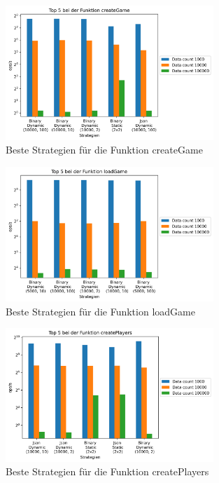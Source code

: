 \begin{figure}[htp]
    \centering
    \includegraphics[width=0.7\textwidth]{images/plots/createGame.png}
    \caption{Beste Strategien für die Funktion createGame}
    \label{fig:createGame}
\end{figure}

\begin{figure}[htp]
    \centering
    \includegraphics[width=0.7\textwidth]{images/plots/loadGame.png}
    \caption{Beste Strategien für die Funktion loadGame}
    \label{fig:loadGame}
\end{figure}

\begin{figure}[htp]
    \centering
    \includegraphics[width=0.7\textwidth]{images/plots/createPlayers.png}
    \caption{Beste Strategien für die Funktion createPlayers}
    \label{fig:createPlayers}
\end{figure}

